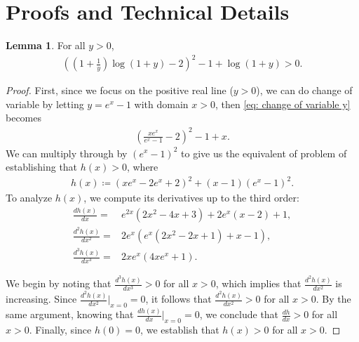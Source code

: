 \documentclass{article}
\theoremstyle{definition}
\newtheorem{lemma}[theorem]{Lemma}
\begin{document}





\newpage
\appendix
\onecolumn
\section{Proofs and Technical Details}

\begin{lemma} \label{lemma: change of variable y > 0}
    For all $y>0$,
    \begin{align} \label{eq: change of variable y}
    \left(\left(1+\frac{1}{y}\right) \log(1+y) - 2\right)^2 - 1 + \log(1+y) > 0.
    \end{align}
\end{lemma}

\begin{proof}
    First, since we focus on the positive real line ($y > 0$), we can do change of variable by letting $y = e^x - 1$ with domain $x > 0$, then \eqref{eq: change of variable y} becomes
    \begin{align*}
        \left( \frac{x e^x}{e^x - 1} - 2 \right)^2 - 1 + x
        .
    \end{align*}
    We can multiply through by $(e^x -1)^2$ to give us the equivalent of problem of establishing that $h(x)>0$, where
    \begin{align*}
        h(x) \coloneqq (x e^x - 2 e^x + 2)^2 + (x-1) (e^x - 1)^2.
    \end{align*}
    To analyze $h(x)$, we compute its derivatives up to the third order:
    \begin{align*}
    \frac{d h(x)}{d x} =& e^{2x}\left(2x^{2}-4x+3\right)+2e^{x}\left(x-2\right)+1 , \\
    \frac{d^2 h(x)}{d x^2} =& 2e^x\left(e^x\left(2x^2-2x+1\right)+x-1\right) , \\
    \frac{d^3 h(x)}{d x^3} =& 2 x e^x (4 x e^x + 1).
    \end{align*}

    We begin by noting that \( \frac{d^3 h(x)}{d x^3} > 0 \) for all \( x > 0 \), which implies that \( \frac{d^2 h(x)}{d x^2} \) is increasing. Since \( \frac{d^2 h(x)}{d x^2} \big|_{x=0} = 0 \), it follows that \( \frac{d^2 h(x)}{d x^2} > 0 \) for all \( x > 0 \). By the same argument, knowing that \( \frac{d h(x)}{d x} \big|_{x=0} = 0 \), we conclude that \( \frac{d h}{d x} > 0 \) for all \( x > 0 \). Finally, since \( h(0) = 0 \), we establish that \( h(x) > 0 \) for all \( x > 0 \).
\end{proof}
\end{document}
